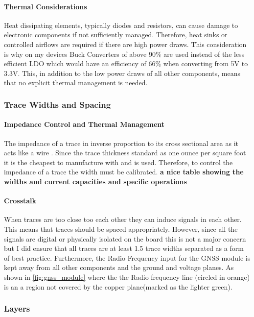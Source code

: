 \paragraph{Thermal Considerations}
Heat dissipating elements, typically diodes and resistors, can cause damage to electronic components if not sufficiently managed. Therefore, heat sinks or controlled airflows are required if there are high power draws. This consideration is why on my devices Buck Converters of above 90\% are used instead of the less efficient \gls{LDO} which would have an efficiency of 66\% when converting from 5V to 3.3V. This, in addition to the low power draws of all other components, means that no explicit thermal management is needed.

\subsubsection{Trace Widths and Spacing}
\paragraph{Impedance Control and Thermal Management}
The impedance of a trace in inverse proportion to its cross sectional area as it acts like a wire \cite{a source}. Since the trace thickness standard as one ounce per square foot \cite{source} it is the cheapest to manufacture with and is used. Therefore, to control the impedance of a trace the width must be calibrated. \textbf{a nice table showing the widths and current capacities and specific operations}
\paragraph{Crosstalk}
When traces are too close too each other they can induce signals in each other. This means that traces should be spaced appropriately. However, since all the signals are digital or physically isolated on the board this is not a major concern but I did ensure that all traces are at least 1.5 trace widths separated as a form of best practice. Furthermore, the Radio Frequency input for the \gls{GNSS module} is kept away from all other components and the ground and voltage planes. As shown in \ref{fig:gnss_module} where the the Radio frequency line (circled in orange) is an a region not covered by the copper plane(marked as the lighter green).

\subsubsection{Layers}
